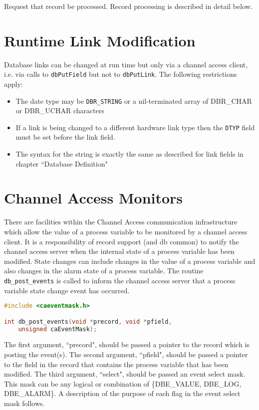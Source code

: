 Request that record be processed.
Record processing is described in detail below.

\section{Runtime Link Modification}

Database links can be changed at run time but only via a channel access client, i.e. via calls to \verb|dbPutField| but not to \verb|dbPutLink|.
The following restrictions apply:

\begin{itemize}
\item The date type may be \verb|DBR_STRING| or a nil-terminated array of DBR\_CHAR or DBR\_UCHAR characters

\item If a link is being changed to a different hardware link type then the \verb|DTYP| field must be set before the link field.

\item The syntax for the string is exactly the same as described for link fields in chapter ``Database Definition"

\end{itemize}

\section{Channel Access Monitors}

There are facilities within the Channel Access communication infrastructure which allow the value of a process variable to be monitored by a channel access client.
It is a responsibility of record support (and db common) to notify the channel access server when the internal state of a process variable has been modified.
State changes can include changes in the value of a process variable and also changes in the alarm state of a process variable.
The routine \verb|db_post_events| is called to inform the channel access server that a process variable state change event has occurred.

\begin{lstlisting}[language=C]
#include <caeventmask.h>

int db_post_events(void *precord, void *pfield,
    unsigned caEventMask);
\end{lstlisting}

The first argument, ``precord", should be passed a pointer to the record which is posting the event(s).
The second argument, ``pfield", should be passed a pointer to the field in the record that contains the process variable that has been modified.
The third argument, ``select", should be passed an event select mask.
This mask can be any logical or combination of \{DBE\_VALUE, DBE\_LOG, DBE\_ALARM\}.
A description of the purpose of each flag in the event select mask follows.

